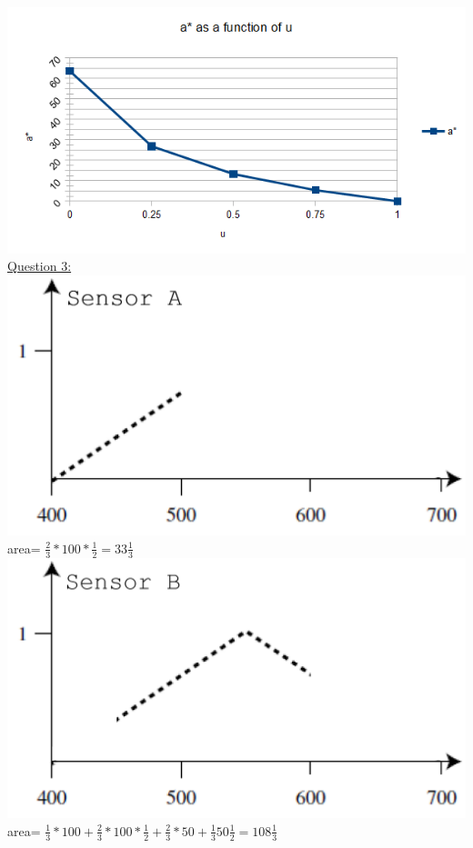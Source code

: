 \documentclass[12pt]{article}\usepackage{amsmath}
\begin{document}
\includegraphics[scale=1]{b.png}
\pagebreak\\
\underline{Question 3:}\\
\includegraphics[scale=1]{SensorA.png}
area= $\frac{2}{3}*100*\frac{1}{2} = 33\frac{1}{3}$\\
\includegraphics[scale=1]{SensorB.png}\\
area= $\frac{1}{3}*100 + \frac{2}{3}*100*\frac{1}{2}+ \frac{2}{3}*50 + \frac{1}{3}50\frac{1}{2} = 108 \frac{1}{3}$\\
\end{document}
